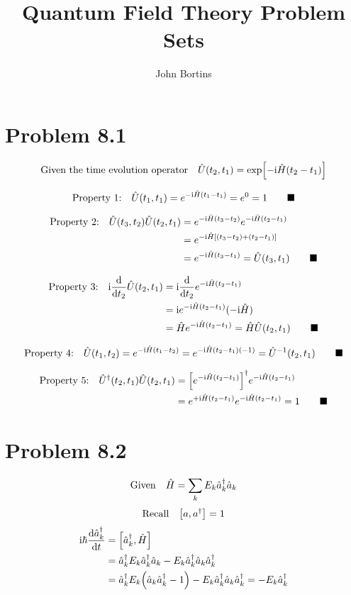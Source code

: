 \documentclass{article}
\title{Quantum Field Theory Problem Sets}
\author{John Bortins}
\begin{document}
 
\maketitle{}
 
\section*{Problem 8.1} 

\[\qq*{Given the time evolution operator} \hat{U}(t_2,t_1)=\exp[-\text{i}\hat{H}(t_2-t_1)] \]
 
\[\qq*{Property 1:} \hat{U}(t_1,t_1)=e^{-\text{i}\hat{H}(t_1-t_1)}=e^{0}=1\qquad\blacksquare \]

\begin{align*}
\qq*{Property 2:} \hat{U}(t_3,t_2)\hat{U}(t_2,t_1)&=e^{-\text{i}\hat{H}(t_3-t_2)}e^{-\text{i}\hat{H}(t_2-t_1)}\\
&=e^{-\text{i}\hat{H}[(t_3-t_2)+(t_2-t_1)]}\\
&=e^{-\text{i}\hat{H}(t_3-t_1)}=\hat{U}(t_3,t_1)\qquad\blacksquare 
\end{align*}

\begin{align*}
\qq*{Property 3:} \text{i}\dv{t_2}\hat{U}(t_2,t_1)&=\text{i}\dv{t_2}e^{-\text{i}\hat{H}(t_2-t_1)}\\
&=\text{i}e^{-\text{i}\hat{H}(t_2-t_1)}(-\text{i}\hat{H}) \\
&=\hat{H}e^{-\text{i}\hat{H}(t_2-t_1)}=\hat{H}\hat{U}(t_2,t_1) \qquad\blacksquare 
\end{align*}
 

\[\qq*{Property 4:} \hat{U}(t_1,t_2)=e^{-\text{i}\hat{H}(t_1-t_2)}=e^{-\text{i}\hat{H}(t_2-t_1)(-1)}=\hat{U}^{-1}(t_2,t_1)\qquad\blacksquare \]

\begin{align*}
\qq*{Property 5:} \hat{U}^{\dagger}(t_2,t_1)\hat{U}(t_2,t_1)&=\qty[e^{-\text{i}\hat{H}(t_2-t_1)}]^{\dagger} e^{-\text{i}\hat{H}(t_2-t_1)}\\
&=e^{+\text{i}\hat{H}(t_2-t_1)}e^{-\text{i}\hat{H}(t_2-t_1)}=1 \qquad\blacksquare 
\end{align*}
 

\section*{Problem 8.2}
 
\[\qq*{Given} \hat{H}=\sum_k E_k \hat{a}_k^\dagger \hat{a}_k \] 
\[\qq*{Recall} \qty[a,a^\dagger]=1\]
\begin{align*}
\text{i}\hbar\dv{\hat{a}_k^\dagger }{t}&= \qty[\hat{a}_k^\dagger ,\hat{H}]\\
&=\hat{a}_k^\dagger E_{k}\hat{a}_k^\dagger\hat{a}_k-E_{k}\hat{a}_k^\dagger\hat{a}_k\hat{a}_k^\dagger \\
&=\hat{a}_k^\dagger E_{k}\qty(\hat{a}_k\hat{a}_k^\dagger-1)-E_{k}\hat{a}_k^\dagger\hat{a}_k\hat{a}_k^\dagger =-E_{k}\hat{a}_k^\dagger 
\end{align*}
\end{document}
